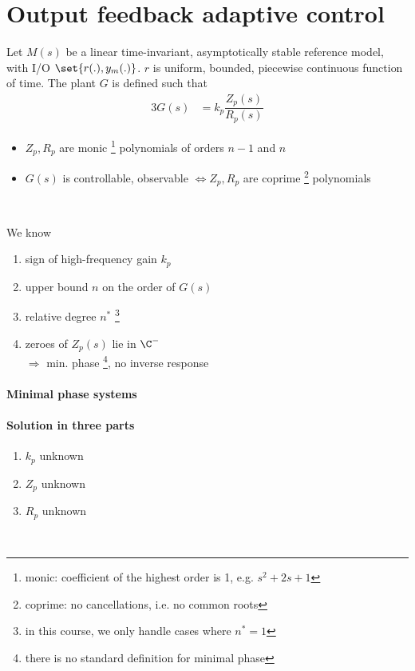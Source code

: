 \section{Output feedback adaptive control}
Let $M(s)$ be a linear time-invariant,
asymptotically stable reference model, with I/O
$\set{r(.), y_m(.)}$.
$r$ is uniform, bounded, piecewise continuous function of time.
The plant $G$ is defined such that
\begin{alignat*}{3}
G(s) &= k_p \dfrac{Z_p(s)}{R_p(s)}
\end{alignat*}

\begin{itemize}
\item $Z_p, R_p$ are monic%
    \footnote{monic: coefficient of the highest order is 1, e.g. $s^2+ 2s + 1$}
    polynomials of orders $n-1$ and $n$ 
\item $G(s)$ is controllable, observable $\Leftrightarrow Z_p, R_p$ are 
    coprime%
    \footnote{coprime: no cancellations, i.e. no common roots}
    polynomials
\end{itemize}~

We know
\begin{enumerate}
\item sign of high-frequency gain $k_p$ 
\item upper bound $n$ on the order of $G(s)$ 
\item relative degree $n^*$ %
    \footnote{in this course, we only handle cases where $n^* = 1$}
\item zeroes of $Z_p(s)$ lie in $\C^-$\\
    $\Rightarrow$ min. phase%
    \footnote{there is no standard definition for minimal phase},
    no inverse response
\end{enumerate}

\paragraph{Minimal phase systems}


\paragraph{Solution in three parts}
\begin{enumerate}
\item $k_p$ unknown
\item $Z_p$ unknown
 \item $R_p$ unknown
\end{enumerate}~

